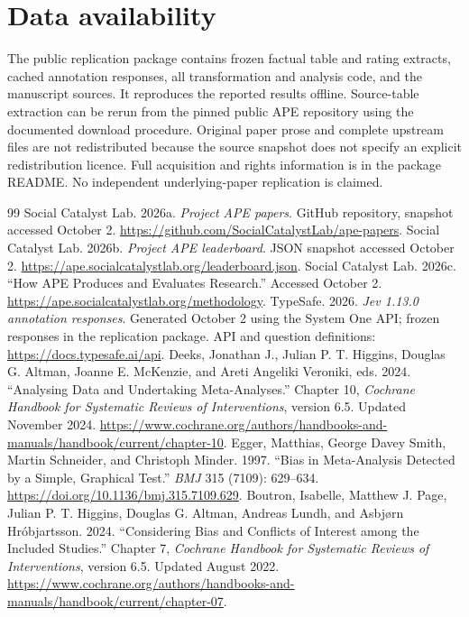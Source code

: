 \documentclass[11pt]{article}
\begin{document}
\section*{Data availability}
The public replication package contains frozen factual table and rating extracts, cached annotation responses, all transformation and analysis code, and the manuscript sources. It reproduces the reported results offline. Source-table extraction can be rerun from the pinned public APE repository using the documented download procedure. Original paper prose and complete upstream files are not redistributed because the source snapshot does not specify an explicit redistribution licence. Full acquisition and rights information is in the package README. No independent underlying-paper replication is claimed.

\begin{thebibliography}{99}
 Social Catalyst Lab. 2026a. \textit{Project APE papers}. GitHub repository, snapshot accessed October 2. \url{https://github.com/SocialCatalystLab/ape-papers}.
 Social Catalyst Lab. 2026b. \textit{Project APE leaderboard}. JSON snapshot accessed October 2. \url{https://ape.socialcatalystlab.org/leaderboard.json}.
 Social Catalyst Lab. 2026c. ``How APE Produces and Evaluates Research.'' Accessed October 2. \url{https://ape.socialcatalystlab.org/methodology}.
 TypeSafe. 2026. \textit{Jev 1.13.0 annotation responses}. Generated October 2 using the System One API; frozen responses in the replication package. API and question definitions: \url{https://docs.typesafe.ai/api}.
 Deeks, Jonathan J., Julian P. T. Higgins, Douglas G. Altman, Joanne E. McKenzie, and Areti Angeliki Veroniki, eds. 2024. ``Analysing Data and Undertaking Meta-Analyses.'' Chapter 10, \textit{Cochrane Handbook for Systematic Reviews of Interventions}, version 6.5. Updated November 2024. \url{https://www.cochrane.org/authors/handbooks-and-manuals/handbook/current/chapter-10}.
 Egger, Matthias, George Davey Smith, Martin Schneider, and Christoph Minder. 1997. ``Bias in Meta-Analysis Detected by a Simple, Graphical Test.'' \textit{BMJ} 315 (7109): 629--634. \url{https://doi.org/10.1136/bmj.315.7109.629}.
 Boutron, Isabelle, Matthew J. Page, Julian P. T. Higgins, Douglas G. Altman, Andreas Lundh, and Asbj\o rn Hr\'objartsson. 2024. ``Considering Bias and Conflicts of Interest among the Included Studies.'' Chapter 7, \textit{Cochrane Handbook for Systematic Reviews of Interventions}, version 6.5. Updated August 2022. \url{https://www.cochrane.org/authors/handbooks-and-manuals/handbook/current/chapter-07}.

\end{thebibliography}
\end{document}
